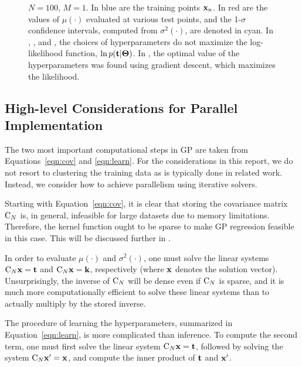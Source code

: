 \begin{figure}[t]
\begin{center}
{{        $N=100$, $M=1$.  In blue are the training points ${\bf x}_n$.  In red are the
        values of $\mu(\cdot)$ evaluated at various test points, and the 1-$\sigma$
        confidence intervals, computed from $\sigma^2(\cdot)$, are denoted in cyan.  In
        , , and , the choices of
        hyperparameters do not maximize the log-likelihood function, $\ln p({\bf t} |
        {\boldsymbol \Theta})$.  In , the optimal value of the
        hyperparameters was found using gradient descent, which maximizes the
        likelihood.} }
    \label{fig:learn}
  \end{center}
\end{figure}

\subsection{High-level Considerations for Parallel Implementation}
\label{sub:considerationsforparallelimplementation}

The two most important computational steps in \ac{GP} are taken from
Equations~\ref{eqn:cov} and \ref{eqn:learn}.  For the considerations in this report,
we do not resort to clustering the training data as is typically done in related work.
Instead, we consider how to achieve parallelism using iterative solvers.

Starting with Equation~\ref{eqn:cov}, it is clear that storing the covariance matrix
$\mathrm{C}_N$ is, in general, infeasible for large datasets due to memory limitations.
Therefore, the kernel function ought to be sparse to make \ac{GP} regression feasible in
this case.  This will be discussed further in .

In order to evaluate $\mu(\cdot)$ and $\sigma^2(\cdot)$, one must solve the linear systems
$\mathrm{C}_N {\bf x} = {\bf t}$ and $\mathrm{C}_N {\bf x} = {\bf k}$, respectively (where ${\bf
  x}$ denotes the solution vector).  Unsurprisingly, the inverse of $\mathrm{C}_N$ will be
dense even if $\mathrm{C}_N$ is sparse, and it is much more computationally efficient to solve
these linear systems than to actually multiply by the stored inverse.

The procedure of learning the hyperparameters, summarized in Equation~\ref{eqn:learn}, is
more complicated than inference.  To compute the second term, one must first
solve the linear system $\mathrm{C}_N {\bf x} = {\bf t}$, followed by solving the system
$\mathrm{C}_N {\bf x}' = {\bf x}$, and compute the inner product of ${\bf t}$ and ${\bf x}'$.

